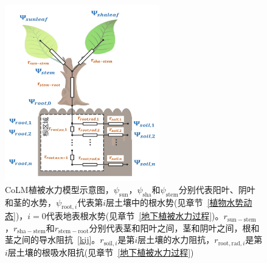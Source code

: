 {
  \begin{figure}[htb]
    \centering
    \includegraphics[width=0.6\textwidth]{Figures/植被水力模式/CoLM植被水力模型示意图.png}
    \caption[CoLM植被水力模型示意图]{CoLM植被水力模型示意图，$\psi_{\mathrm{sun}}$，$\psi_{\mathrm{sha}}$和$\psi_{\mathrm{stem}}$分别代表阳叶、阴叶和茎的水势，$\psi_{\mathrm{root},i}$代表第$i$层土壤中的根水势(见章节~\ref{植物水势动态})，$i=0$代表地表根水势(见章节~\ref{地下植被水力过程})。$r_{\mathrm{sun-stem}}$，$r_{\mathrm{sha-stem}}$和$r_{\mathrm{stem-root}}$分别代表茎和阳叶之间，茎和阴叶之间，根和茎之间的导水阻抗~\eqref{kij}。$r_{\mathrm{soil},i}$是第$i$层土壤的水力阻抗，$r_{\mathrm{root,rad},i}$是第$i$层土壤的根吸水阻抗(见章节~\ref{地下植被水力过程})}
    \label{fig:CoLM植被水力模型示意图}
  \end{figure}
}


